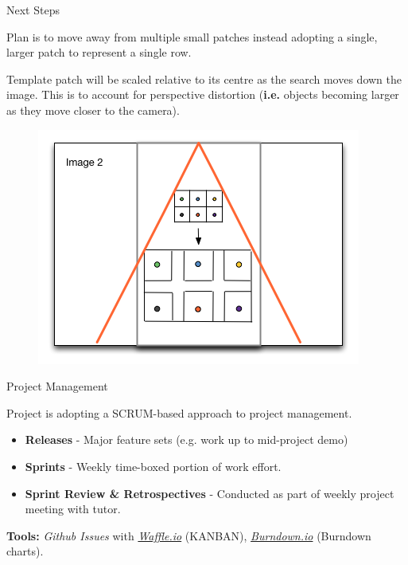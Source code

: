 \documentclass[10pt, compress]{beamer}
\begin{document}
\begin{frame}{Next Steps}

Plan is to move away from multiple small patches instead adopting a single, larger patch to represent a single row. \\ \vspace{0.5cm}

Template patch will be scaled relative to its centre as the search moves down the image. This is to account for perspective distortion (\textbf{i.e.} objects becoming larger as they move closer to the camera).

\begin{figure}[ht!]
\centering
\includegraphics[scale=0.4]{scaling.png}
\end{figure}
	
\end{frame}

\begin{frame}{Project Management}

Project is adopting a SCRUM-based approach to project management. \\ \vspace{0.2cm}

\begin{itemize}
	\item \textbf{Releases} - Major feature sets (e.g. work up to mid-project demo)
	\item \textbf{Sprints} - Weekly time-boxed portion of work effort.
	\item \textbf{Sprint Review \& Retrospectives} - Conducted as part of weekly project meeting with tutor. 
\end{itemize}


\textbf{Tools:} \textit{Github Issues} with \textit{\href{http://waffle.io}{Waffle.io}} (KANBAN), \textit{\href{http://burndown.io/}{Burndown.io}} (Burndown charts).
	
\end{frame}
\end{document}
